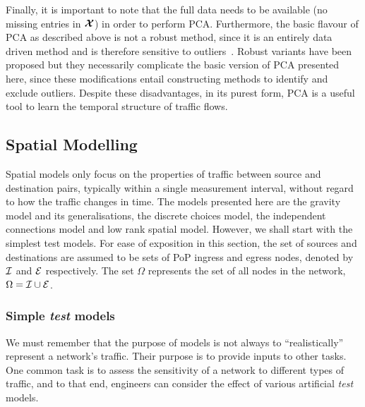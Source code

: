 Finally, it is important to note that the full data needs to be
available (no missing entries in $\boldsymbol{\mathcal{X}}$) in order to perform
PCA. Furthermore, the basic flavour of PCA as described above is not a
robust method, since it is an entirely data driven method and is
therefore sensitive to outliers~\cite{Ringberg07PCA}. Robust variants
have been proposed but they necessarily complicate the basic version
of PCA presented here, since these modifications entail constructing
methods to identify and exclude outliers. Despite these disadvantages,
in its purest form, PCA is a useful tool to learn the temporal
structure of traffic flows.

\subsection{Spatial Modelling}

Spatial models only focus on the properties of traffic between source
and destination pairs, typically within a single measurement interval,
without regard to how the traffic changes in time. The models
presented here are the gravity model and its generalisations, the
discrete choices model, the independent connections model and low rank
spatial model. However, we shall start with the simplest test models. For ease of
exposition in this section, the set of sources and destinations are
assumed to be sets of PoP ingress and egress nodes, denoted by $\mathcal{I}$
and $\mathcal{E}$ respectively. The set $\Omega$ represents the set of all
nodes in the network, \ie~$\Omega = \mathcal{I} \cup \mathcal{E}$.

\subsubsection{Simple {\em test} models}

We must remember that the purpose of models is not always to
``realistically'' represent a network's traffic. Their purpose is to
provide inputs to other tasks. One common task is to assess the
sensitivity of a network to different types of traffic, and to that
end, engineers can consider the effect of various artificial {\em test}
models. 

